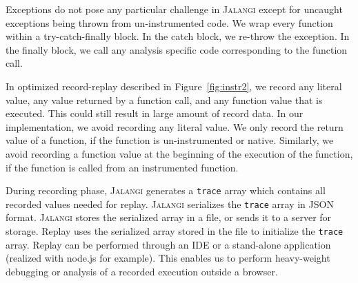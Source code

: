\documentclass{sig-alternate}
\def\jalangi{\textsc{Jalangi}}
\begin{document}
Exceptions do not pose any particular challenge in \jalangi{} except
for uncaught exceptions being thrown from un-instrumented code.  We
wrap every function within a try-catch-finally block.  In the catch
block, we re-throw the exception.  In the finally block, we call any
analysis specific code corresponding to the function call.


In optimized record-replay described in Figure~\ref{fig:instr2}, we
record any literal value, any value returned by a function call, and
any function value that is executed.  This could still result in large
amount of record data.  In our implementation, we avoid recording any
literal value.  We only record the return value of a function, if the
function is un-instrumented or native.  Similarly, we avoid recording
a function value at the beginning of the execution of the function, if
the function is called from an instrumented function.

During recording phase, \jalangi{} generates a \texttt{trace} array
which contains all recorded values needed for replay.  \jalangi{}
serializes the \texttt{trace} array in JSON format.  \jalangi{} stores
the serialized array in a file, or sends it to a server for storage.
Replay uses the serialized array stored in the file to initialize the
\texttt{trace} array. Replay can be performed through an IDE or a
stand-alone application (realized with node.js for example). This
enables us to perform heavy-weight debugging or analysis of a recorded
execution outside a browser.
\end{document}
